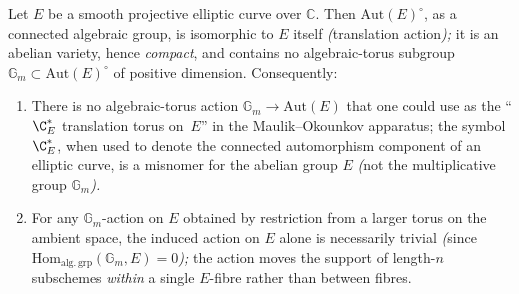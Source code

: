 \begin{lemma}
\label{lem:no-Gm-on-E}
Let $E$ be a smooth projective elliptic curve over $\mathbb{C}$.
Then $\mathrm{Aut}(E)^{\circ}$, as a connected algebraic group,
is isomorphic to $E$ itself \emph{(}translation action\emph{);} it
is an abelian variety, hence \emph{compact}, and contains no
algebraic-torus subgroup $\mathbb{G}_m \subset \mathrm{Aut}(E)^\circ$
of positive dimension. Consequently:
\begin{enumerate}[label=\textup{(\roman*)}]
 \item There is no algebraic-torus action $\mathbb{G}_m \to
 \mathrm{Aut}(E)$ that one could use as the ``$\C^*_E$
 translation torus on~$E$'' in the Maulik--Okounkov apparatus;
 the symbol $\C^*_E$, when used to denote the connected
 automorphism component of an elliptic curve, is a misnomer for
 the abelian group $E$ \emph{(}not the multiplicative group
 $\mathbb{G}_m$\emph{).}
 \item For any $\mathbb{G}_m$-action on $E$ obtained by
 restriction from a larger torus on the ambient space, the
 induced action on $E$ alone is necessarily trivial \emph{(}since
 $\mathrm{Hom}_{\mathrm{alg.\,grp}}(\mathbb{G}_m, E) = 0$\emph{);} the
 action moves the support of length-$n$ subschemes \emph{within}
 a single $E$-fibre rather than between fibres.
\end{enumerate}
\end{lemma}

